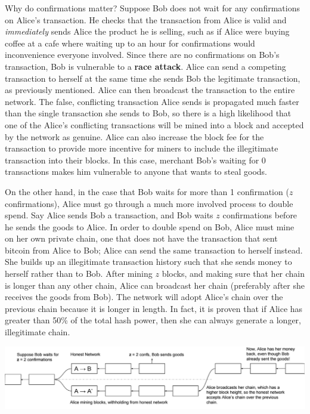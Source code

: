 \documentclass[full.tex]{subfiles}
\begin{document}
  Why do confirmations matter? Suppose Bob does not wait for any confirmations on Alice's transaction. He checks that the transaction from Alice is valid and \textit{immediately} sends Alice the product he is selling, such as if Alice were buying coffee at a cafe where waiting up to an hour for confirmations would inconvenience everyone involved. Since there are no confirmations on Bob's transaction, Bob is vulnerable to a \textbf{race attack}. Alice can send a competing transaction to herself at the same time she sends Bob the legitimate transaction, as previously mentioned. Alice can then broadcast the transaction to the entire network. The false, conflicting transaction Alice sends is propagated much faster than the single transaction she sends to Bob, so there is a high likelihood that one of the Alice's conflicting transactions will be mined into a block and accepted by the network as genuine. Alice can also increase the block fee for the transaction to provide more incentive for miners to include the illegitimate transaction into their blocks. In this case, merchant Bob's waiting for 0 transactions makes him vulnerable to anyone that wants to steal goods. 
  
  On the other hand, in the case that Bob waits for more than 1 confirmation ($z$ confirmations), Alice must go through a much more involved process to double spend. Say Alice sends Bob a transaction, and Bob waits $z$ confirmations before he sends the goods to Alice. In order to double spend on Bob, Alice must mine on her own private chain, one that does not have the transaction that sent bitcoin from Alice to Bob; Alice can send the same transaction to herself instead. She builds up an illegitimate transaction history such that she sends money to herself rather than to Bob. After mining $z$ blocks, and making sure that her chain is longer than any other chain, Alice can broadcast her chain (preferably after she receives the goods from Bob). The network will adopt Alice's chain over the previous chain because it is longer in length. In fact, it is proven that if Alice has greater than 50\% of the total hash power, then she can always generate a longer, illegitimate chain.
  \medskip
 
   \includegraphics[scale=0.3]{z_confirmation}
   \smallskip
   
\end{document}

